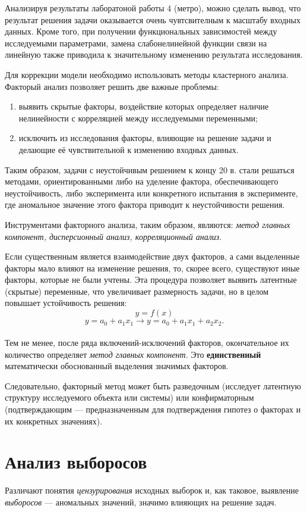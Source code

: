 \documentclass[12pt]{article}
\begin{document}
Анализируя результаты лаборатоной работы 4 (метро), можно сделать вывод, что результат решения задачи оказывается очень чувтсвителным к масштабу входных данных. Кроме того, при получении функциональных зависимостей между исследуемыми параметрами, замена слабонелинейной функции связи на линейную также приводила к значительному изменению результата исследования.

Для коррекции модели необходимо использовать методы кластерного анализа. Факторый анализ позволяет решить две важные проблемы:
\begin{enumerate}
    \item выявить скрытые факторы, воздействие которых определяет наличие нелинейности с корреляцией между исследуемыми переменными;
    \item исключить из исследования факторы, влияющие на решение задачи и делающие её чувствительной к изменению входных данных. 
\end{enumerate} 

Таким образом, задачи с неустойчивым решением к концу 20 в. стали решаться методами, ориентированными либо на уделение фактора, обеспечивающего неустойчивость, либо эксперимента или конкретного испытания в эксперименте, где аномальное значение этого фактора приводит к неустойчивости решения.

Инструментами факторного анализа, таким образом, являются: \emph{метод главных компонент, дисперсионный анализ, корреляционный анализ}.

Если существенным является взаимодействие двух факторов, а сами выделенные факторы мало влияют на изменение решения, то, скорее всего, существуют иные факторы, которые не были учтены. Эта процедура позволяет выявить латентные (скрытые) переменные, что увеличивает размерность задачи, но в целом повышает устойчивость решения:
\[ y = f(x)\]
\[ y = a_0 + a_1 x_1 \longrightarrow y = a_0 + a_1 x_1 + a_2 x_2. \]\\ 

Тем не менее, после ряда включений-исключений факторов, окончательное их количество определяет \emph{метод главных компонент}. Это \textbf{единственный} математически обоснованный выделения значимых факторов.

Следовательно, факторный метод может быть разведочным (исследует латентную структуру исследуемого объекта или системы) или конфирматорным (подтверждающим --- предназначенным для подтверждения гипотез о факторах и их конкретных значениях).

\newpage
\section{Анализ выборосов}
Различают понятия \emph{цензурирования} исходных выборок и, как таковое, выявление \emph{выборосов} --- аномальных значений, значимо влияющих на решение задач.
\end{document}

